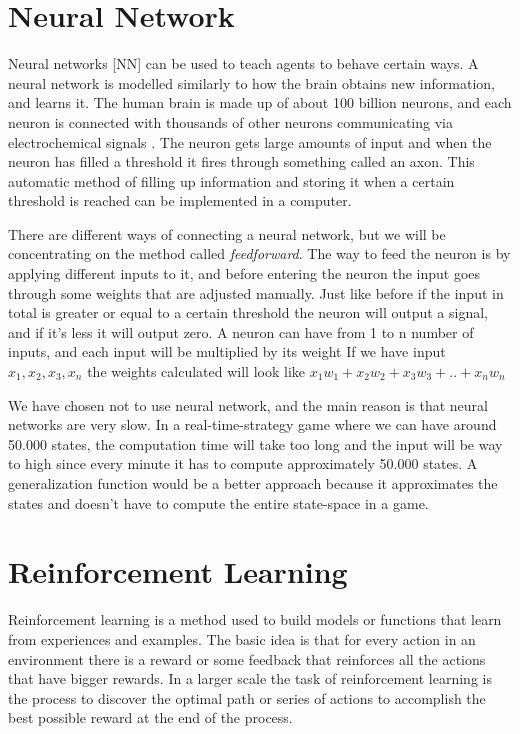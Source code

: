 \section{Neural Network}			 
			
Neural networks [NN] can be used to teach agents to behave certain ways.
A neural network is modelled similarly to how the brain obtains new information, and learns it. The human brain is made up of about 100 billion neurons, and each neuron is connected with thousands of other neurons communicating via electrochemical signals \cite{nn}. The neuron gets large amounts of input and when the neuron has filled a threshold it fires through something called an axon. This automatic method of filling up information and storing it when a certain threshold is reached can be implemented in a computer.

There are different ways of connecting a neural network, but we will be concentrating on the method called \textit{feedforward}. The way to feed the neuron is by applying different inputs to it, and before entering the neuron the input goes through some weights that are adjusted manually. Just like before if the input in total is greater or equal to a certain threshold the neuron will output a signal, and if it's less it will output zero.
A neuron can have from 1 to n number of inputs, and each input will be multiplied by its weight
If we have input $x_1, x_2, x_3, x_n$ the weights calculated will look like $x_1 w_1 + x_2 w_2 + x_3 w_3 + .. +  x_n w_n$


We have chosen not to use neural network, and the main reason is that neural networks are very slow. In a real-time-strategy game where we can have around 50.000 states, the computation time will take too long and the input will be way to high since every minute it has to compute approximately 50.000 states. A generalization function would be a better approach because it approximates the states and doesn't have to compute the entire state-space in a game. 


\section{Reinforcement Learning}

	Reinforcement learning is a method used to build models or functions that learn from experiences and examples. The basic idea is that for every action in an environment there is a reward or some feedback that reinforces all the actions that have bigger rewards. In a larger scale the task of reinforcement learning is the process to discover the optimal path or series of actions to accomplish the best possible reward at the end of the process. 

